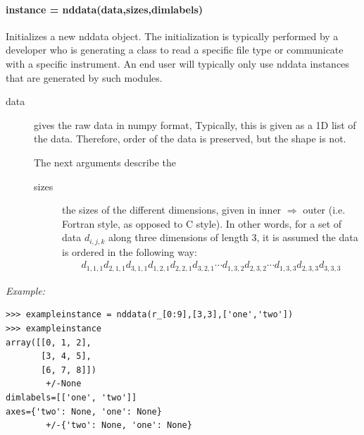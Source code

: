 \paragraph{instance = nddata(data,sizes,dimlabels)}
Initializes a new nddata object.
The initialization is typically performed by a developer
    who is generating a class to read a specific file type
    or communicate with a specific instrument.
An end user will typically only use nddata instances that are
    generated by such modules.
    \begin{mykwargs}
        \begin{description}
            \item[data] gives the raw data in numpy format,
                Typically, this is given as a 1D list of the data.
                Therefore, order of the data is preserved, but the shape is not.
            \item[] The next arguments describe the 
                \begin{description}
                    \item[sizes] the sizes of the different dimensions,
                        given in inner $\Rightarrow$ outer
                        (i.e. Fortran style, as opposed to C style).
                        In other words, for a set of data $d_{i,j,k}$ along three dimensions of length 3,
                        it is assumed the data is ordered in the following way:
                        \begin{align}
                            d_{1,1,1}
                            d_{2,1,1}
                            d_{3,1,1}
                            d_{1,2,1}
                            d_{2,2,1}
                            d_{3,2,1}
                            \cdots
                            d_{1,3,2}
                            d_{2,3,2}
                            \cdots
                            d_{1,3,3}
                            d_{2,3,3}
                            d_{3,3,3}
                        \end{align}
                \end{description}
        \end{description}
    \end{mykwargs}
{\it Example:}
\begin{lstlisting}
>>> exampleinstance = nddata(r_[0:9],[3,3],['one','two'])
>>> exampleinstance
array([[0, 1, 2],
       [3, 4, 5],
       [6, 7, 8]])
        +/-None
dimlabels=[['one', 'two']]
axes={'two': None, 'one': None}
        +/-{'two': None, 'one': None}
\end{lstlisting}
